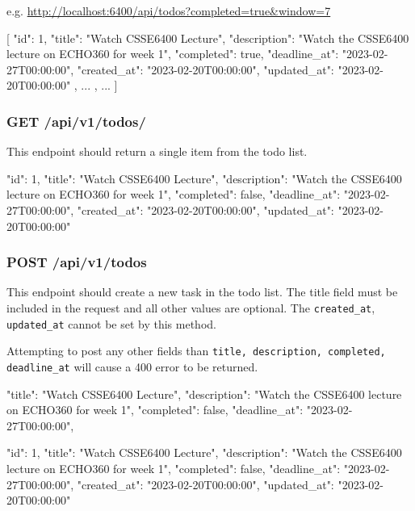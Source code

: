 \documentclass{csse4400}
\begin{document}
e.g. \url{http://localhost:6400/api/todos?completed=true&window=7}
\begin{code}[language=json,numbers=none]{}
  [
    {
      "id": 1,
      "title": "Watch CSSE6400 Lecture",
      "description": "Watch the CSSE6400 lecture on ECHO360 for week 1",
      "completed": true,
      "deadline_at": "2023-02-27T00:00:00",
      "created_at": "2023-02-20T00:00:00",
      "updated_at": "2023-02-20T00:00:00"
    },
    {
      ...
    },
    ...
  ]
\end{code}

\subsubsection{GET /api/v1/todos/}
This endpoint should return a single item from the todo list.


\begin{code}[language=json,numbers=none]{}
  {
    "id": 1,
    "title": "Watch CSSE6400 Lecture",
    "description": "Watch the CSSE6400 lecture on ECHO360 for week 1",
    "completed": false,
    "deadline_at": "2023-02-27T00:00:00",
    "created_at": "2023-02-20T00:00:00",
    "updated_at": "2023-02-20T00:00:00"
  }
\end{code}

\subsubsection{POST /api/v1/todos}
This endpoint should create a new task in the todo list. The title field must be included in the request and all other values are optional. The \texttt{created\_at}, \texttt{updated\_at} cannot be set by this method.

Attempting to post any other fields than \texttt{title, description, completed, deadline\_at} will cause a 400 error to be returned.


\begin{code}[language=json,numbers=none]{}
  {
    "title": "Watch CSSE6400 Lecture",
    "description": "Watch the CSSE6400 lecture on ECHO360 for week 1",
    "completed": false,
    "deadline_at": "2023-02-27T00:00:00",
  }
\end{code}


\begin{code}[language=json,numbers=none]{}
  {
    "id": 1,
    "title": "Watch CSSE6400 Lecture",
    "description": "Watch the CSSE6400 lecture on ECHO360 for week 1",
    "completed": false,
    "deadline_at": "2023-02-27T00:00:00",
    "created_at": "2023-02-20T00:00:00",
    "updated_at": "2023-02-20T00:00:00"
  }
\end{code}
\end{document}
